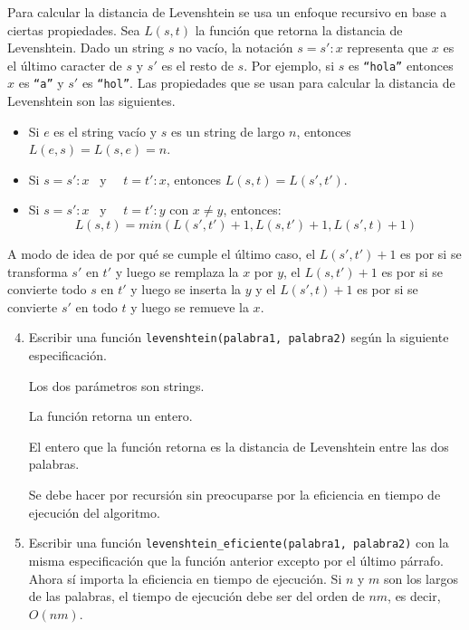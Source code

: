 \documentclass[a4paper,12pt]{book}
\theoremstyle{definition}
\begin{document}
	Para calcular la distancia de Levenshtein se usa un enfoque recursivo en base a ciertas propiedades. Sea $L(s,t)$ la función que retorna la distancia de Levenshtein. Dado un string $s$ no vacío, la notación $s=s'{:}x$ representa que $x$ es el último caracter de $s$  y $s'$ es el resto de $s$. Por ejemplo, si $s$ es {\tt ``hola''} entonces $x$ es {\tt ``a''} y $s'$ es {\tt ``hol''}. Las propiedades que se usan para calcular la distancia de Levenshtein son las siguientes.
	\begin{itemize}
		\item Si $e$ es el string vacío y $s$ es un string de largo $n$, entonces $L(e,s)=L(s,e)=n$.
		\item Si $s=s'{:}x$ ~y~~ $t=t'{:}x$, entonces $L(s,t)=L(s',t')$.
		\item Si $s=s'{:}x$ ~y~~ $t=t'{:}y$ con $x\not=y$, entonces:
		$$L(s,t) = min(L(s',t')+1,L(s,t')+1,L(s',t)+1)
		$$
	\end{itemize}
	A modo de idea de por qué se cumple el último caso, el $L(s',t')+1$ es por si se transforma $s'$ en $t'$ y luego se remplaza la $x$ por $y$, el $L(s,t')+1$ es por si se convierte todo $s$ en $t'$ y luego se inserta la $y$ y el $L(s',t)+1$ es por si se convierte $s'$ en todo $t$ y luego se remueve la $x$.
	
	\begin{enumerate}
		\setcounter{enumi}{3}
		\item Escribir una función {\tt levenshtein(palabra1, palabra2)} según la siguiente especificación.
		
		Los dos parámetros son strings.
		
		La función retorna un entero.
		
		El entero que la función retorna es la distancia de Levenshtein entre las dos palabras.
		
		Se debe hacer por recursión sin preocuparse por la eficiencia en tiempo de ejecución del algoritmo.
		
		\item Escribir una función {\tt levenshtein\_eficiente(palabra1, palabra2)} con la misma especificación que la función anterior excepto por el último párrafo. Ahora sí importa la eficiencia en tiempo de ejecución. Si $n$ y $m$ son los largos de las palabras, el tiempo de ejecución debe ser del orden de $nm$, es decir, $O(nm)$.
	\end{enumerate}
	
\end{document}
